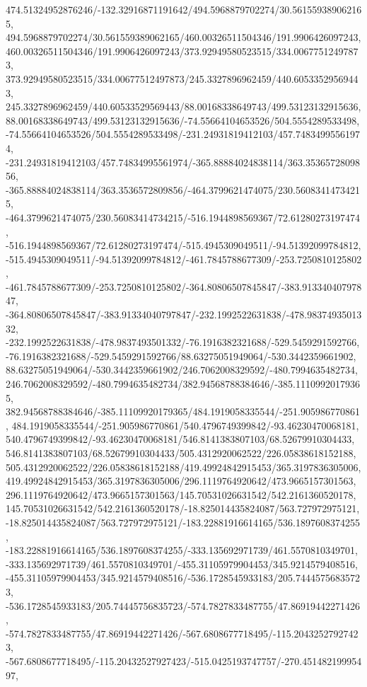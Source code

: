 {    474.51324952876246/-132.32916871191642/494.5968879702274/30.561559389062165,
    494.5968879702274/30.561559389062165/460.00326511504346/191.9906426097243,
    460.00326511504346/191.9906426097243/373.92949580523515/334.00677512497873,
    373.92949580523515/334.00677512497873/245.3327896962459/440.60533529569443,
    245.3327896962459/440.60533529569443/88.00168338649743/499.53123132915636,
    88.00168338649743/499.53123132915636/-74.55664104653526/504.5554289533498,
    -74.55664104653526/504.5554289533498/-231.24931819412103/457.74834995561974,
    -231.24931819412103/457.74834995561974/-365.88884024838114/363.3536572809856,
    -365.88884024838114/363.3536572809856/-464.3799621474075/230.56083414734215,
    -464.3799621474075/230.56083414734215/-516.1944898569367/72.61280273197474,
    -516.1944898569367/72.61280273197474/-515.4945309049511/-94.51392099784812,
    -515.4945309049511/-94.51392099784812/-461.7845788677309/-253.7250810125802,
    -461.7845788677309/-253.7250810125802/-364.80806507845847/-383.91334040797847,
    -364.80806507845847/-383.91334040797847/-232.1992522631838/-478.9837493501332,
    -232.1992522631838/-478.9837493501332/-76.1916382321688/-529.5459291592766,
    -76.1916382321688/-529.5459291592766/88.63275051949064/-530.3442359661902,
    88.63275051949064/-530.3442359661902/246.7062008329592/-480.7994635482734,
    246.7062008329592/-480.7994635482734/382.94568788384646/-385.11109920179365,
    382.94568788384646/-385.11109920179365/484.1919058335544/-251.905986770861,
    484.1919058335544/-251.905986770861/540.4796749399842/-93.46230470068181,
    540.4796749399842/-93.46230470068181/546.8141383807103/68.52679910304433,
    546.8141383807103/68.52679910304433/505.4312920062522/226.05838618152188,
    505.4312920062522/226.05838618152188/419.49924842915453/365.3197836305006,
    419.49924842915453/365.3197836305006/296.1119764920642/473.9665157301563,
    296.1119764920642/473.9665157301563/145.70531026631542/542.2161360520178,
    145.70531026631542/542.2161360520178/-18.825014435824087/563.727972975121,
    -18.825014435824087/563.727972975121/-183.22881916614165/536.1897608374255,
    -183.22881916614165/536.1897608374255/-333.135692971739/461.5570810349701,
    -333.135692971739/461.5570810349701/-455.31105979904453/345.9214579408516,
    -455.31105979904453/345.9214579408516/-536.1728545933183/205.74445756835723,
    -536.1728545933183/205.74445756835723/-574.7827833487755/47.86919442271426,
    -574.7827833487755/47.86919442271426/-567.6808677718495/-115.20432527927423,
    -567.6808677718495/-115.20432527927423/-515.0425193747757/-270.45148219995497,
}
